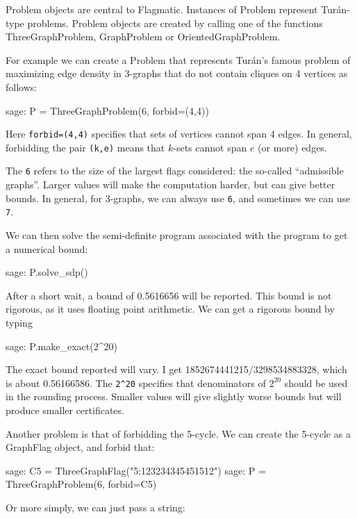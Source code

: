 \documentclass{article}
\providecommand{\flagmatic}{Flagmatic}
\begin{document}
Problem objects are central to \flagmatic. Instances of Problem represent Turán-type problems. Problem objects are created by calling one of the functions ThreeGraphProblem, GraphProblem or OrientedGraphProblem.

For example we can create a Problem that represents Turán's famous problem of maximizing edge density in 3-graphs that do not contain cliques on 4 vertices as follows:

\begin{sage}
sage: P = ThreeGraphProblem(6, forbid=(4,4))
\end{sage}

Here \verb|forbid=(4,4)| specifies that sets of vertices cannot span 4 edges. In general, forbidding the pair \verb|(k,e)| means that $k$-sets cannot span $e$ (or more) edges. 

The \verb|6| refers to the size of the largest flags considered: the so-called ``admissible graphs''. Larger values will make the computation harder, but can give better bounds. In general, for 3-graphs, we can always use \verb|6|, and sometimes we can use \verb|7|.

We can then solve the semi-definite program associated with the program to get a numerical bound:

\begin{sage}
sage: P.solve_sdp()
\end{sage}

After a short wait, a bound of 0.5616656 will be reported. This bound is not rigorous, as it uses floating point arithmetic. We can get a rigorous bound by typing

\begin{sage}
sage: P.make_exact(2^20)
\end{sage}

The exact bound reported will vary. I get 1852674441215/3298534883328, which is about 0.56166586. The \verb|2^20| specifies that denominators of $2^{20}$ should be used in the rounding process. Smaller values will give slightly worse bounds but will produce smaller certificates.

Another problem is that of forbidding the 5-cycle. We can create the 5-cycle as a GraphFlag object, and forbid that:

\begin{sage}
sage: C5 = ThreeGraphFlag("5:123234345451512")
sage: P = ThreeGraphProblem(6, forbid=C5)
\end{sage}

Or more simply, we can just pass a string:
\end{document}
